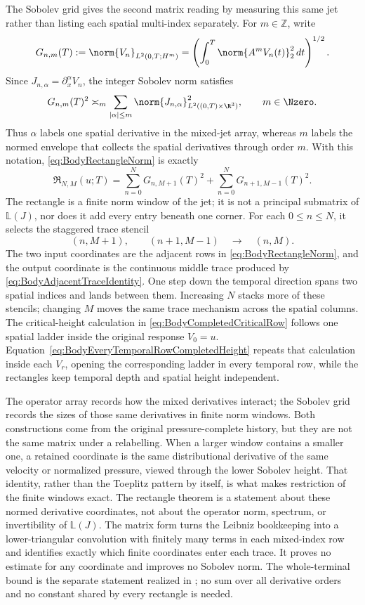 The Sobolev grid gives the second matrix reading by measuring this same jet rather than listing each spatial multi-index separately.
For \(m\in\mathbb Z\), write
\[
  G_{n,m}(T)
  :=\norm{V_n}_{L^2(0,T;H^m)}
  =\left(\int_0^T\norm{A^mV_n(t)}_2^2\,dt\right)^{1/2}.
\]
Since \(J_{n,\alpha}=\partial_x^\alpha V_n\), the integer Sobolev norm satisfies
\[
  G_{n,m}(T)^2
  \asymp_m
  \sum_{|\alpha|\leq m}
  \norm{J_{n,\alpha}}_{L^2((0,T)\times\R^3)}^2,
  \qquad m\in\Nzero.
\]
Thus \(\alpha\) labels one spatial derivative in the mixed-jet array, whereas \(m\) labels the normed envelope that collects the spatial derivatives through order \(m\).
With this notation, \eqref{eq:BodyRectangleNorm} is exactly
\[
  \mathfrak R_{N,M}(u;T)
  =\sum_{n=0}^{N}G_{n,M+1}(T)^2
   +\sum_{n=0}^{N}G_{n+1,M-1}(T)^2.
\]
The rectangle is a finite norm window of the jet; it is not a principal submatrix of \(\mathbb L(J)\), nor does it add every entry beneath one corner.
For each \(0\leq n\leq N\), it selects the staggered trace stencil
\[
  (n,M+1),
  \qquad
  (n+1,M-1)
  \quad\longrightarrow\quad
  (n,M).
\]
The two input coordinates are the adjacent rows in \eqref{eq:BodyRectangleNorm}, and the output coordinate is the continuous middle trace produced by \eqref{eq:BodyAdjacentTraceIdentity}.
One step down the temporal direction spans two spatial indices and lands between them.
Increasing \(N\) stacks more of these stencils; changing \(M\) moves the same trace mechanism across the spatial columns.
The critical-height calculation in \eqref{eq:BodyCompletedCriticalRow} follows one spatial ladder inside the original response \(V_0=u\).
Equation~\eqref{eq:BodyEveryTemporalRowCompletedHeight} repeats that calculation inside each \(V_r\), opening the corresponding ladder in every temporal row, while the rectangles keep temporal depth and spatial height independent.

The operator array records how the mixed derivatives interact; the Sobolev grid records the sizes of those same derivatives in finite norm windows.
Both constructions come from the original pressure-complete history, but they are not the same matrix under a relabelling.
When a larger window contains a smaller one, a retained coordinate is the same distributional derivative of the same velocity or normalized pressure, viewed through the lower Sobolev height.
That identity, rather than the Toeplitz pattern by itself, is what makes restriction of the finite windows exact.
The rectangle theorem is a statement about these normed derivative coordinates, not about the operator norm, spectrum, or invertibility of \(\mathbb L(J)\).
The matrix form turns the Leibniz bookkeeping into a lower-triangular convolution with finitely many terms in each mixed-index row and identifies exactly which finite coordinates enter each trace.
It proves no estimate for any coordinate and improves no Sobolev norm.
The whole-terminal bound is the separate statement realized in ; no sum over all derivative orders and no constant shared by every rectangle is needed.

